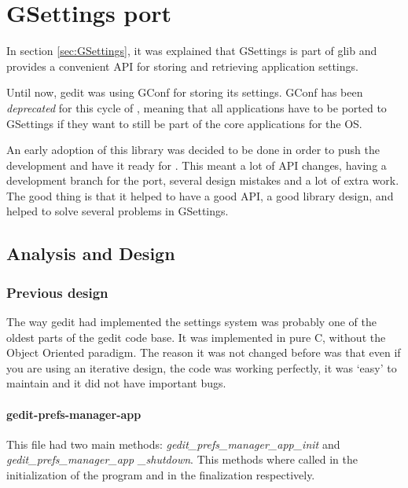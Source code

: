 
\chapter{GSettings port}

In section \ref{sec:GSettings}, it was explained that GSettings is part of glib and provides a convenient API for storing and retrieving application settings.

Until now, gedit was using GConf for storing its settings. GConf has been \emph{deprecated} for this cycle of \GNOME, meaning that all \GNOME applications have to be ported to GSettings if they want to still be part of the core applications for the \GNOME OS.

An early adoption of this library was decided to be done in order to push the development and have it ready for . This meant a lot of API changes, having a development branch for the port, several design mistakes and a lot of extra work.   The good thing is that it helped to have a good API, a good library design, and helped to solve several problems in GSettings.

\section{Analysis and Design}

\subsection{Previous design}

The way gedit had implemented the settings system  was probably one of the oldest parts of the gedit code base. It was implemented in pure C, without the Object Oriented paradigm. The reason it was not changed before was that even if you are using an iterative design, the code was working perfectly, it was `easy' to maintain and it did not have important bugs.

\newpage
\subsubsection*{gedit-prefs-manager-app}

This file had two main methods: \textit{gedit\_prefs\_manager\_app\_init} and \textit{gedit\_prefs\_manager\_app \_shutdown}. This methods where called in the initialization of the program and in the finalization respectively.

